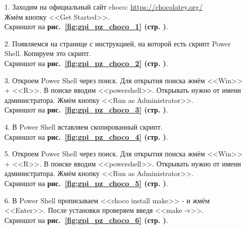 \begin{itemize}
    \item[1.] Заходим на официальный сайт choco:
    \url{https://chocolatey.org/} \\
    Жмём кнопку <<Get Started>>. \\
    Скриншот на \textbf{рис.~\ref{fig:gpi_pz_choco_1} (стр. \pageref{fig:gpi_pz_choco_1})}.

    \item[2.] Появляемся на странице с инструкцией, на которой есть скрипт Power Shell.
    Копируем это скрипт. \\
    Скриншот на \textbf{рис.~\ref{fig:gpi_pz_choco_2} (стр. \pageref{fig:gpi_pz_choco_2})}.

    \item[3.] Откроем Power Shell через поиск.
    Для открытия поиска жмём <<Win>> + <<R>>.
    В поиске вводим <<powershell>>.
    Открывать нужно от имени администратора.
    Жмём кнопку <<Run as Administrator>>. \\
    Скриншот на \textbf{рис.~\ref{fig:gpi_pz_choco_3} (стр. \pageref{fig:gpi_pz_choco_3})}.

    \item[4.] В Power Shell вставляем скопированный скрипт. \\
    Скриншот на \textbf{рис.~\ref{fig:gpi_pz_choco_4} (стр. \pageref{fig:gpi_pz_choco_4})}.

    \item[5.] Откроем Power Shell через поиск.
    Для открытия поиска жмём <<Win>> + <<R>>.
    В поиске вводим <<powershell>>.
    Открывать нужно от имени администратора.
    Жмём кнопку <<Run as Administrator>>. \\
    Скриншот на \textbf{рис.~\ref{fig:gpi_pz_choco_5} (стр. \pageref{fig:gpi_pz_choco_5})}.

    \item[6.] В Power Shell прописываем <<choco install make>> - и жмём <<Enter>>.
    После установки проверяем введя <<make -v>>. \\
    Скриншот на \textbf{рис.~\ref{fig:gpi_pz_choco_6} (стр. \pageref{fig:gpi_pz_choco_6})}.

\end{itemize}

